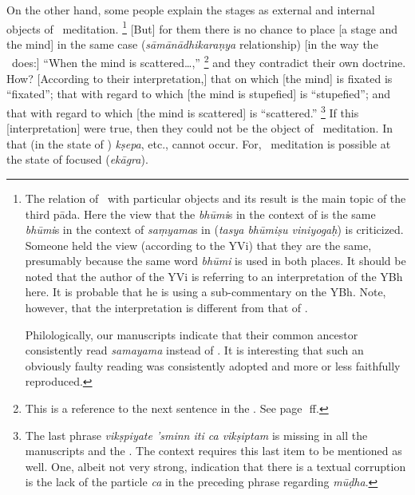 On%
 the other hand, some people explain the stages as external and internal objects of \samyama\ meditation.%
  \footnote{The relation of \samyama\ with particular objects and its result is the main topic of the third {pāda}.  Here the view that the \emph{bhūmi\/}s in the context of  is the same \emph{bhūmi\/}s in the context of \emph{saṃyama\/}s in  (\emph{tasya bhūmiṣu viniyogaḥ}) is criticized.  Someone held the view (according to the YVi) that they are the same, presumably because the same word \emph{bhūmi\/} is used in both places.  It should be noted that the author of the YVi is referring to an interpretation of the YBh here.  It is probable that he is using a sub-commentary on the YBh.  Note, however, that the interpretation is different from that of \Vacaspati.%

  Philologically, our manuscripts indicate that their common ancestor consistently read \emph{samayama} instead of \samyama.  It is interesting that such an obviously faulty reading was consistently adopted and more or less faithfully reproduced.%
  } %
[But] for them there is no chance to place [a stage and the mind] in the same case (\emph{sāmānādhikaraṇya} relationship) [in the way the \Bhasyakara\ does:] ``When the mind is scattered\ldots\@,''%
  \footnote{This is a reference to the next sentence in the \bhasya.  See page~\pageref{ATRVKSP}\,ff.%
  } %
and they contradict their own doctrine.  How?  [According to their interpretation,] that on which [the mind] is fixated is ``fixated''; that with regard to which  [the mind is stupefied] is ``stupefied''; and that with regard to which [the mind is scattered] is ``scattered.''%
  \footnote{The last phrase \emph{vikṣpiyate 'sminn iti ca vikṣiptam} is missing in all the manuscripts and the \EP.  The context requires this last item to be mentioned as well.  One, albeit not very strong, indication that there is a textual corruption is the lack of the particle \emph{ca} in the preceding phrase regarding \emph{mūḍha}.%
  }  %
If this [interpretation] were true, then they could not be the object of \samyama\ meditation.  In that (in the state of \samyama) \emph{kṣepa}, etc., cannot occur.  For, \samyama\ meditation is possible at the state of focused (\emph{ekāgra}).

